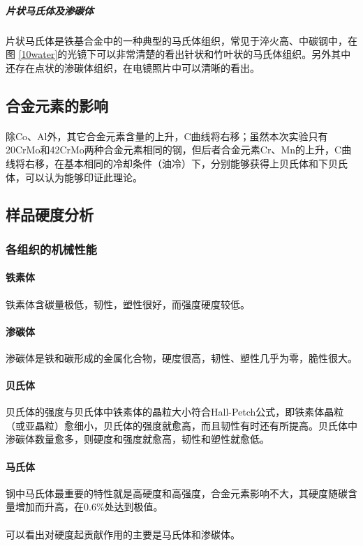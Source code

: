\documentclass[12pt]{ctexart}
\begin{document}
\subparagraph{片状马氏体及渗碳体}
片状马氏体是铁基合金中的一种典型的马氏体组织，常见于淬火高、中碳钢中，在图 \ref{10water}的光镜下可以非常清楚的看出针状和竹叶状的马氏体组织。另外其中还存在点状的渗碳体组织，在电镜照片中可以清晰的看出。
\subsection{合金元素的影响}
\paragraph{}
除Co、Al外，其它合金元素含量的上升，C曲线将右移；虽然本次实验只有20CrMo和42CrMo两种合金元素相同的钢，但后者合金元素Cr、Mn的上升，C曲线将右移，在基本相同的冷却条件（油冷）下，分别能够获得上贝氏体和下贝氏体，可以认为能够印证此理论。
\subsection{样品硬度分析}
\subsubsection{各组织的机械性能}
\paragraph{铁素体}
铁素体含碳量极低，韧性，塑性很好，而强度硬度较低。
\paragraph{渗碳体}
渗碳体是铁和碳形成的金属化合物，硬度很高，韧性、塑性几乎为零，脆性很大。
\paragraph{贝氏体}
贝氏体的强度与贝氏体中铁素体的晶粒大小符合Hall-Petch公式，即铁素体晶粒（或亚晶粒）愈细小，贝氏体的强度就愈高，而且韧性有时还有所提高。贝氏体中渗碳体数量愈多，则硬度和强度就愈高，韧性和塑性就愈低。
\paragraph{马氏体}
钢中马氏体最重要的特性就是高硬度和高强度，合金元素影响不大，其硬度随碳含量增加而升高，在0.6\%处达到极值。
\paragraph{}
可以看出对硬度起贡献作用的主要是马氏体和渗碳体。
\end{document}
